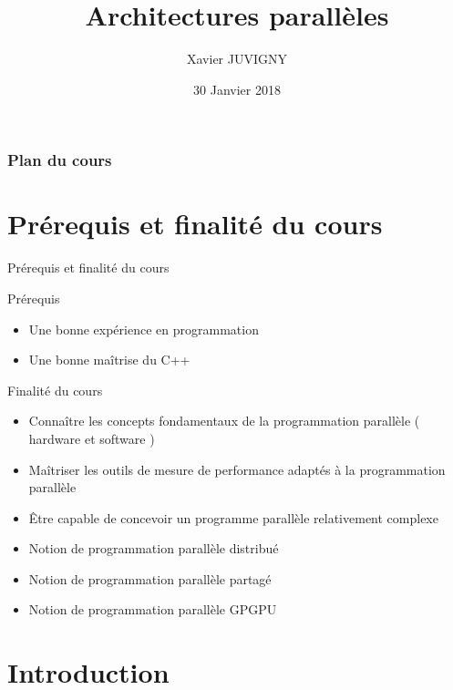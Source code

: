 \documentclass[handout]{beamer}
\title[Architectures parallèles\hspace{2em}]{Architectures parallèles}
\author[Xavier JUVIGNY]{Xavier JUVIGNY}
\date{30 Janvier 2018}
\institute{ONERA}
\begin{document}

\begin{frame}
 \titlepage
\end{frame}

\begin{frame}
\frametitle{Plan du cours}
\tableofcontents
\end{frame}

\section{Prérequis et finalité du cours}

\begin{frame}[fragile]{Prérequis et finalité du cours}

  \begin{block}{Prérequis}
    \begin{itemize}
      \item Une bonne expérience en programmation
      \item Une bonne maîtrise du C++
    \end{itemize}
  \end{block}
  
  \begin{block}{Finalité du cours}
    \begin{itemize}
    \item Connaître les concepts fondamentaux de la programmation parallèle ( hardware et software )
    \item Maîtriser les outils de mesure de performance adaptés à la programmation parallèle
    \item Être capable de concevoir un programme parallèle relativement complexe
    \item Notion de programmation parallèle distribué
    \item Notion de programmation parallèle partagé
    \item Notion de programmation parallèle GPGPU
    \end{itemize}
  \end{block}

\end{frame}

\section{Introduction}
\end{document}
